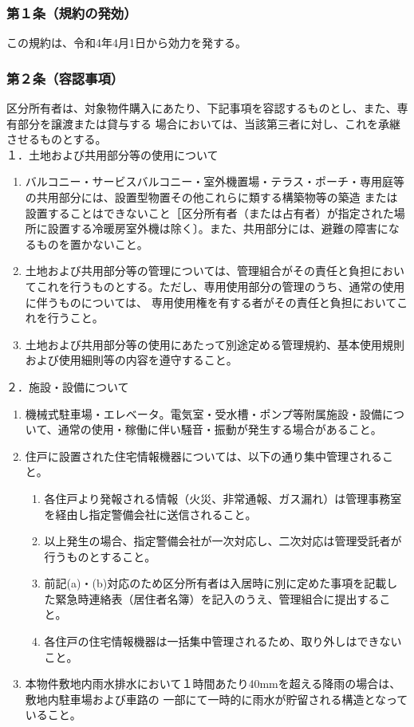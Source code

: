 \documentclass[12pt,uplatex,dvipdfmx]{jsarticle}
\begin{document}
\subsubsection*{第１条（規約の発効）}
この規約は、令和4年4月1日から効力を発する。
\subsubsection*{第２条（容認事項）}
区分所有者は、対象物件購入にあたり、下記事項を容認するものとし、また、専有部分を譲渡または貸与する
場合においては、当該第三者に対し、これを承継させるものとする。\\
１．土地および共用部分等の使用について
\begin{enumerate}
\item バルコニー・サービスバルコニー・室外機置場・テラス・ポーチ・専用庭等の共用部分には、設置型物置その他これらに類する構築物等の築造
または設置することはできないこと［区分所有者（または占有者）が指定された場所に設置する冷暖房室外機は除く〕。また、共用部分には、避難の障害になるものを置かないこと。
\item 土地および共用部分等の管理については、管理組合がその責任と負担においてこれを行うものとする。ただし、専用使用部分の管理のうち、通常の使用に伴うものについては、
      専用使用権を有する者がその責任と負担においてこれを行うこと。
\item 土地および共用部分等の使用にあたって別途定める管理規約、基本使用規則および使用細則等の内容を遵守すること。
\end{enumerate}
２．施設・設備について
\begin{enumerate}
\item 機械式駐車場・エレベータ。電気室・受水槽・ポンプ等附属施設・設備について、通常の使用・稼働に伴い騒音・振動が発生する場合があること。
\item 住戸に設置された住宅情報機器については、以下の通り集中管理されること。
\begin{enumerate}
      \item 各住戸より発報される情報（火災、非常通報、ガス漏れ）は管理事務室を経由し指定警備会社に送信されること。
      \item 以上発生の場合、指定警備会社が一次対応し、二次対応は管理受託者が行うものとすること。
      \item 前記(a)・(b)対応のため区分所有者は入居時に別に定めた事項を記載した緊急時連絡表（居住者名簿）を記入のうえ、管理組合に提出すること。
      \item 各住戸の住宅情報機器は一括集中管理されるため、取り外しはできないこと。
\end{enumerate}
\item 本物件敷地内雨水排水において１時間あたり40mmを超える降雨の場合は、敷地内駐車場および車路の
      一部にて一時的に雨水が貯留される構造となっていること。
\end{enumerate}
\end{document}
